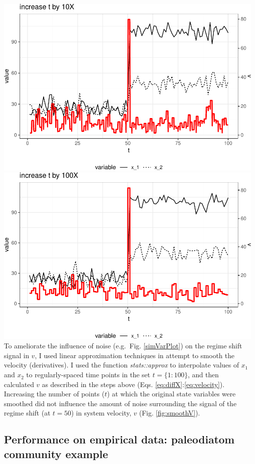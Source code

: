 \documentclass[12pt,twoside,openany]{reedthesis}
\begin{document}
\includegraphics{_myDissertation_files/figure-latex/smoothV-4.pdf}
\includegraphics{_myDissertation_files/figure-latex/smoothV-5.pdf} To
ameliorate the influence of noise (e.g.~Fig. \ref{simVarPlot}) on the
regime shift signal in \(v\), I used linear approximation techniques in
attempt to smooth the velocity (derivatives). I used the function
\emph{stats::approx} to interpolate values of \(x_1\) and \(x_2\) to
regularly-spaced time points in the set \(t=\{1:100\}\), and then
calculated \(v\) as described in the steps above (Eqs.
\eqref{eq:diffX}:\eqref{eq:velocity}). Increasing the number of points
(\(t\)) at which the original state variables were smoothed did not
influence the amount of noise surrounding the signal of the regime shift
(at \(t=50\)) in system velocity, \(v\) (Fig. \ref{fig:smoothV}).

\subsection{Performance on empirical data: paleodiatom community
example}\label{performance-on-empirical-data-paleodiatom-community-example}
\end{document}

